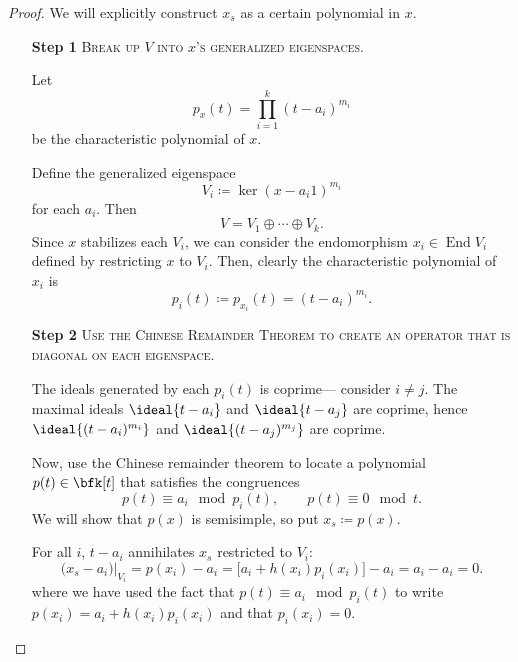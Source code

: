 \documentclass{article}
\DeclarePairedDelimiter\ideal\langle\rangle
\DeclareMathOperator{\End}{End}
\begin{document}
\begin{proof}
    We will explicitly construct $x_s$ as a certain polynomial in $x$.

    \begin{itemize}
        \item[\textbf{Step 1}] 
            \textsc{\color{Crimson} Break up $V$ into $x$'s generalized eigenspaces.}

            Let
            \[
                p_x(t)
                =
                \prod_{i=1}^k
                (t - a_i)^{m_i}
            \]
            be the characteristic polynomial of $x$.

            Define the generalized eigenspace
            \[
                V_i
                \coloneq
                \ker (x - a_i 1)^{m_i}
            \]
            for each $a_i$.
            Then
            \[
                V 
                =
                V_1 \oplus \cdots \oplus V_k.
            \]
            Since $x$ stabilizes each $V_i$, we can consider the endomorphism $x_i \in \End V_i$ defined by restricting $x$ to $V_i$.
            Then, clearly the characteristic polynomial of $x_i$ is
            \[
                p_i(t)
                \coloneq
                p_{x_i}(t)
                =
                (t-a_i)^{m_i}.
            \]
        \item[\textbf{Step 2}] 
            \textsc{\color{Crimson} Use the Chinese Remainder Theorem to create an operator that is diagonal on each eigenspace.}

            The ideals generated by each $p_i(t)$ is coprime--- consider $i \neq j$.
            The maximal ideals $\ideal{t-a_i}$ and $\ideal{t-a_j}$ are coprime, hence $\ideal{(t-a_i)^{m_i}}$ and $\ideal{(t-a_j)^{m_j}}$ are coprime.

            Now, use the Chinese remainder theorem to locate a polynomial $p(t) \in \bfk[t]$ that satisfies the congruences
            \[
                p(t)
                \equiv
                a_i \mod p_i(t)
                ,\qquad
                p(t)
                \equiv
                0 \mod t.
            \]
            We will show that $p(x)$ is semisimple, so put $x_s \coloneq p(x)$.

            For all $i$, $t - a_i$ annihilates $x_s$ restricted to $V_i$:
            \[
                \big(x_s - a_i\big)\big\rvert_{V_i}
                =
                p(x_i) - a_i
                =
                \big[a_i + h(x_i)p_i(x_i)\big] - a_i
                =
                a_i - a_i
                =
                0.
            \]
            where we have used the fact that $p(t) \equiv a_i \mod p_i(t)$ to write $p(x_i) = a_i + h(x_i)p_i(x_i)$ and that $p_i(x_i) = 0$.
    \end{itemize}

\end{proof}
\end{document}
